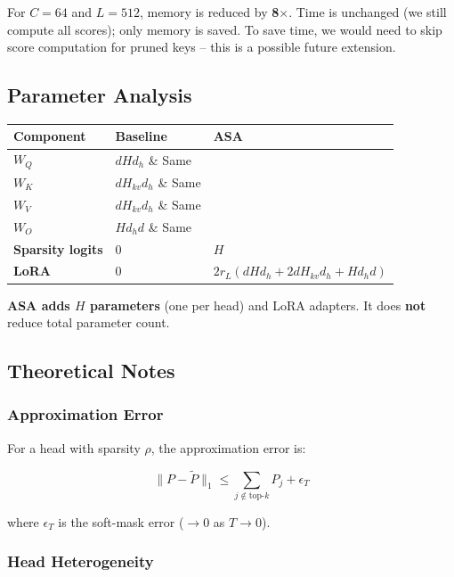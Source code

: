 For $C = 64$ and $L = 512$, memory is reduced by 
\textbf{8$\times$}. Time is unchanged (we still compute all scores); 
only memory is saved. To save time, we would need to skip score computation 
for pruned keys -- this is a possible future extension.

\subsection{Parameter Analysis}

\begin{table}[H]
\centering
\small
\begin{tabular}{lll}
\toprule
\textbf{Component} & \textbf{Baseline} & \textbf{ASA} \\
\midrule
$W_Q$ & $d H d_h$ \& Same \\
$W_K$ & $d H_{kv} d_h$ \& Same \\
$W_V$ & $d H_{kv} d_h$ \& Same \\
$W_O$ & $H d_h d$ \& Same \\
\textbf{Sparsity logits} & 0 & \textbf{$H$} \\
\textbf{LoRA} & 0 & $2 r_L (d H d_h + 2 d H_{kv} d_h + H d_h d)$ \\
\bottomrule
\end{tabular}
\end{table}

\textbf{ASA adds $H$ parameters} (one per head) and LoRA adapters. It does \textbf{not} 
reduce total parameter count.

\subsection{Theoretical Notes}

\subsubsection{Approximation Error}

For a head with sparsity $\rho$, the approximation error is:

\[
\|P - \tilde{P}\|_1 \leq \sum_{j \notin \text{top-}k} P_j + \epsilon_T
\]

where $\epsilon_T$ is the soft-mask error ($\to 0$ as $T \to 0$).

\subsubsection{Head Heterogeneity}

